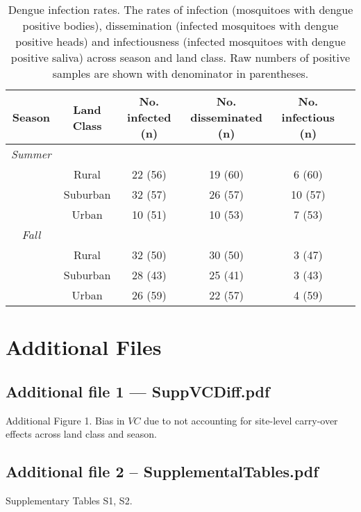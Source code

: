 \documentclass[12pt]{article}
\begin{document}
\begin{table}[h!]
\caption{Dengue infection rates. The rates of infection (mosquitoes with dengue positive bodies), dissemination (infected mosquitoes with dengue positive heads) and infectiousness (infected mosquitoes with dengue positive saliva) across season and land class. Raw numbers of positive samples are shown with denominator in parentheses.}
  \begin{tabular}{cccccc}
  \hline
  \textbf{Season} & \textbf{Land Class} & \textbf{No. infected (n)}  & \textbf{No. disseminated (n)} & \textbf{No. infectious (n)}\\ \hline
  \textit{Summer} 	&   &   &   &   \\
   					& Rural 	& 22 (56) & 19 (60) & 6 (60) \\
  					& Suburban 	& 32 (57) & 26 (57) & 10 (57) \\
  					& Urban 	& 10 (51) & 10 (53) & 7 (53) \\

  \textit{Fall} 	&   &   &   &   \\
   					& Rural 	& 32 (50) & 30 (50) & 3 (47) \\
  					& Suburban 	& 28 (43) & 25 (41) & 3 (43) \\
  					& Urban 	& 26 (59) & 22 (57) & 4 (59) \\
  \hline
  \end{tabular}
    \label{table:infectionRates}
\end{table}


\newpage

\section*{Additional Files}
  \subsection*{Additional file 1 --- SuppVCDiff.pdf}
    Additional Figure 1. Bias in $VC$ due to not accounting for site-level carry-over effects across land class and season.
    \subsection*{Additional file 2 -- SupplementalTables.pdf}
    Supplementary Tables S1, S2.
\end{document}
